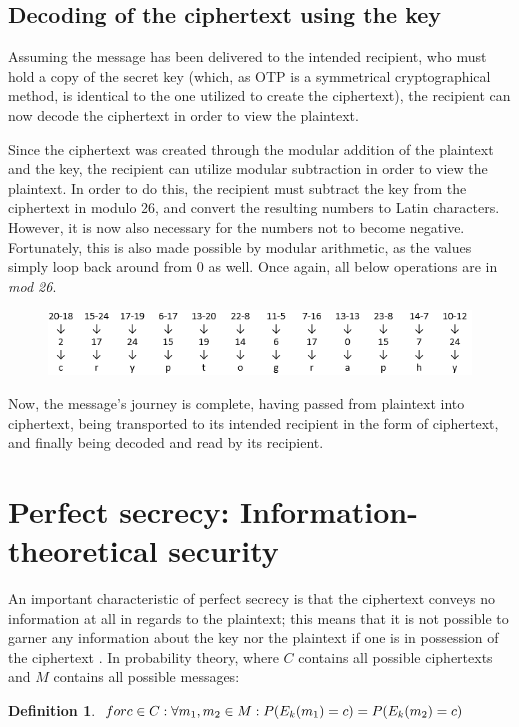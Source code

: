 \documentclass[12pt]{report}
\theoremstyle{definition}
\newtheorem{defin}[thm]{Definition}
\theoremstyle{remark}
\begin{document}
\subsection{Decoding of the ciphertext using the key}
Assuming the message has been delivered to the intended recipient, who must hold a copy of the secret key (which, as OTP is a symmetrical cryptographical method, is identical to the one utilized to create the ciphertext), the recipient can now decode the ciphertext in order to view the plaintext.

Since the ciphertext was created through the modular addition of the plaintext and the key, the recipient can utilize modular subtraction in order to view the plaintext. In order to do this, the recipient must subtract the key from the ciphertext in modulo 26, and convert the resulting numbers to Latin characters.  However, it is now also necessary for the numbers not to become negative. Fortunately, this is also made possible by modular arithmetic, as the values simply loop back around from 0 as well. Once again, all below operations are in \textit{mod 26}.

\begin{figure}[H]
\centering
\includegraphics[scale=1]{Table4.PNG}
\end{figure}

Now, the message's journey is complete, having passed from plaintext into ciphertext, being transported to its intended recipient in the form of ciphertext, and finally being decoded and read by its recipient. 

\section{Perfect secrecy: Information-theoretical security}
An important characteristic of perfect secrecy is that the ciphertext conveys no information at all in regards to the plaintext; this means that it is not possible to garner any information about the key nor the plaintext if one is in possession of the ciphertext \cite{PerfectSecrecy} \cite{HandbookOfAppliedCryptography}. In probability theory, where $C$ contains all possible ciphertexts and $M$ contains all possible messages:

\begin{defin}\label{def:perfectsecrecy}
$for c \in C: \\
\forall m_1, m_2 \in M: \\
P(E_k(m_1)=c) = P(E_k(m_2)=c)$
\end{defin}
\end{document}
